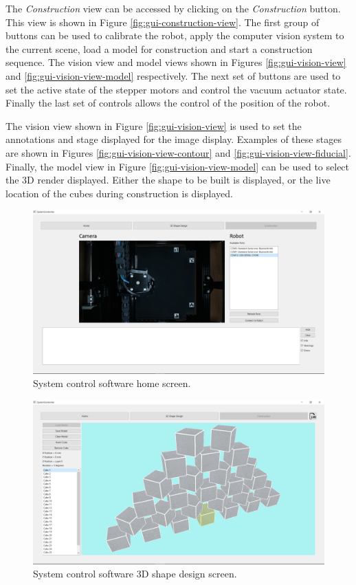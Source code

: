 The \textit{Construction} view can be accessed by clicking on the \textit{Construction} button. This view is shown in Figure \ref{fig:gui-construction-view}. The first group of buttons can be used to calibrate the robot, apply the computer vision system to the current scene, load a model for construction and start a construction sequence. The vision view and model views shown in Figures \ref{fig:gui-vision-view} and \ref{fig:gui-vision-view-model} respectively. The next set of buttons are used to set the active state of the stepper motors and control the vacuum actuator state. Finally the last set of controls allows the control of the position of the robot.

The vision view shown in Figure \ref{fig:gui-vision-view} is used to set the annotations and stage displayed for the image display. Examples of these stages are shown in Figures \ref{fig:gui-vision-view-contour} and \ref{fig:gui-vision-view-fiducial}. Finally, the model view in Figure \ref{fig:gui-vision-view-model} can be used to select the 3D render displayed. Either the shape to be built is displayed, or the live location of the cubes during construction is displayed.

\begin{figure}[!ht]
	\centering
	\includegraphics[width=1\linewidth]{figures/gui-home.png}
	\caption{System control software home screen.}
	\label{fig:gui-home}
\end{figure}

\begin{figure}[!ht]
	\centering
	\includegraphics[width=1\linewidth]{figures/gui-design-view.png}
	\caption{System control software 3D shape design screen.}
	\label{fig:gui-design-view}
\end{figure}

